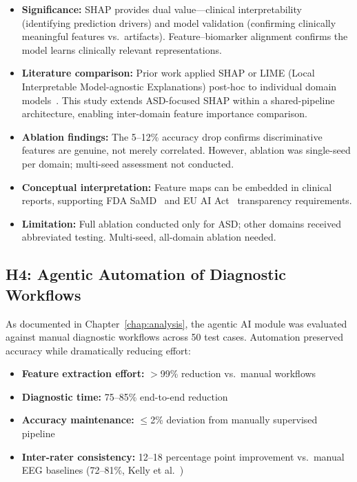 \begin{itemize}
    \item \textbf{Significance:} SHAP provides dual value---clinical interpretability (identifying prediction drivers) and model validation (confirming clinically meaningful features vs.\ artifacts). Feature--biomarker alignment confirms the model learns clinically relevant representations.
    \item \textbf{Literature comparison:} Prior work applied SHAP or LIME (Local Interpretable Model-agnostic Explanations) post-hoc to individual domain models~\cite{arrieta2020xai}. This study extends ASD-focused SHAP within a shared-pipeline architecture, enabling inter-domain feature importance comparison.
    \item \textbf{Ablation findings:} The 5--12\% accuracy drop confirms discriminative features are genuine, not merely correlated. However, ablation was single-seed per domain; multi-seed assessment not conducted.
    \item \textbf{Conceptual interpretation:} Feature maps can be embedded in clinical reports, supporting FDA SaMD~\cite{fda2021aiml} and EU AI Act~\cite{eu2021aiact} transparency requirements.
    \item \textbf{Limitation:} Full ablation conducted only for ASD; other domains received abbreviated testing. Multi-seed, all-domain ablation needed.
\end{itemize}

\subsection{H4: Agentic Automation of Diagnostic Workflows}

As documented in Chapter~\ref{chap:analysis}, the agentic AI module was evaluated against manual diagnostic workflows across 50 test cases. Automation preserved accuracy while dramatically reducing effort:

\begin{itemize}
    \item \textbf{Feature extraction effort:} $>$99\% reduction vs.\ manual workflows
    \item \textbf{Diagnostic time:} 75--85\% end-to-end reduction
    \item \textbf{Accuracy maintenance:} $\leq$2\% deviation from manually supervised pipeline
    \item \textbf{Inter-rater consistency:} 12--18 percentage point improvement vs.\ manual EEG baselines (72--81\%, Kelly et al.~\cite{kelly2019healthcare})
\end{itemize}

